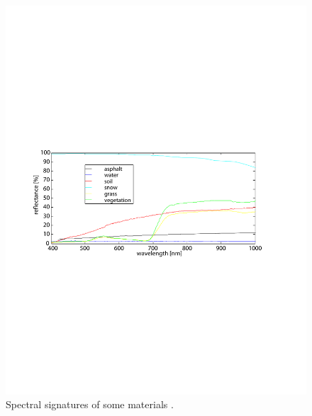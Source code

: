 \documentclass[letterpaper, 10pt, conference]{ieeeconf}      %
\begin{document}
\begin{figure}[t]
      \centering
      \includegraphics[trim = 8mm 99mm 16mm 99mm, clip,width=0.99\linewidth]{../images/multispectralSignature2.pdf}\vspace{-2mm}
      \caption{Spectral signatures of some materials \cite{2009_BaHoGrRi}.}
      \label{fig:Multispectral}
         \vspace{-5mm}
   \end{figure}







\end{document}
